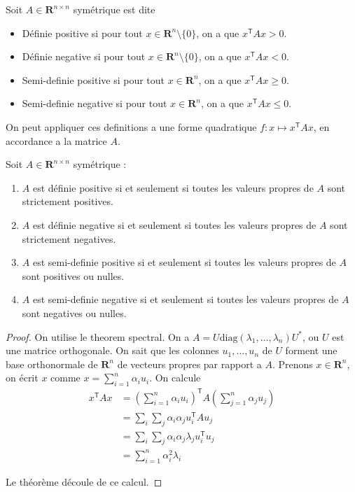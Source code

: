 \begin{definition}
Soit $A\in \mathbf{R}^{n\times n}$ symétrique est dite 
\begin{itemize}
\item Définie positive si pour tout $x \in \mathbf{R}^{n}\setminus \{ 0 \}$, on a que $x^{\mathsf{T}}Ax>0$.
\item Définie negative si pour tout $x \in \mathbf{R}^{n}\setminus \{ 0 \}$, on a que $x^{\mathsf{T}}Ax<0$.
\item Semi-definie positive si pour tout $x \in \mathbf{R}^{n}$, on a que $x^{\mathsf{T}}Ax\ge 0$.
\item Semi-definie negative si pour tout $x \in \mathbf{R}^{n}$, on a que $x^{\mathsf{T}}Ax\le 0$.
\end{itemize}

On peut appliquer ces definitions a une forme quadratique $f:x\mapsto x^{\mathsf{T}}Ax$, en accordance a la matrice $A$.
\end{definition}
\begin{theorem}
Soit $A\in \mathbf{R}^{n\times n}$ symétrique : 
\begin{enumerate}
\item $A$ est définie positive si et seulement si toutes les valeurs propres de $A$ sont strictement positives.
\item $A$ est définie negative si et seulement si toutes les valeurs propres de $A$ sont strictement negatives.
\item $A$ est semi-definie positive si et seulement si toutes les valeurs propres de $A$ sont positives ou nulles.
\item $A$ est semi-definie negative si et seulement si toutes les valeurs propres de $A$ sont negatives ou nulles.
\end{enumerate}
\end{theorem}
\begin{proof}
On utilise le theorem spectral. On a $A=U\mathrm{diag}(\lambda_{1},\dots,\lambda _{n})U^{*}$, ou $U$ est une matrice orthogonale. On sait que les colonnes $u_{1},\dots,u_{n}$ de $U$ forment une base orthonormale de $\mathbf{R}^{n}$ de vecteurs propres par rapport a $A$. Prenons $x \in \mathbf{R}^{n}$, on écrit $x$ comme $x=\sum _{i=1}^{n}\alpha _{i}u_{i}$. On calcule 
\begin{align*}
x^{\mathsf{T}}Ax & =\left( \sum _{i=1}^{n}\alpha _{i}u_{i} \right)^{\mathsf{T}}A\left( \sum _{j=1}^{n}\alpha _{j}u_{j} \right) \\
 & =\sum _{i}\sum _{j}\alpha _{i}\alpha _{j}u_{i}^{\mathsf{T}}Au_{j} \\
 & =\sum _{i}\sum _{j} \alpha _{i}\alpha _{j}\lambda _{j}u_{i}^{\mathsf{T}}u_{j} \\
 & =\sum_{i=1}^{n} \alpha _{i}^{2}\lambda _{i}
\end{align*}

Le théorème découle de ce calcul.
\end{proof}
